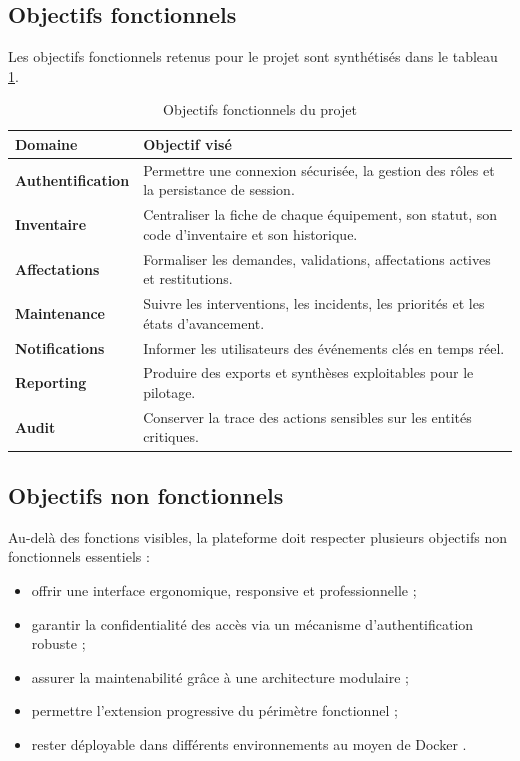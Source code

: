﻿\documentclass[12pt,a4paper,oneside]{report}
\begin{document}
\subsection{Objectifs fonctionnels}
Les objectifs fonctionnels retenus pour le projet sont synthétisés dans le tableau \ref{tab:objectifs-fonctionnels}.

\begin{table}[H]
\centering
\caption{Objectifs fonctionnels du projet}
\label{tab:objectifs-fonctionnels}
\begin{tabularx}{\textwidth}{>{\bfseries}p{3.4cm}X}
\toprule
Domaine & Objectif visé \\
\midrule
Authentification & Permettre une connexion sécurisée, la gestion des rôles et la persistance de session. \\
Inventaire & Centraliser la fiche de chaque équipement, son statut, son code d'inventaire et son historique. \\
Affectations & Formaliser les demandes, validations, affectations actives et restitutions. \\
Maintenance & Suivre les interventions, les incidents, les priorités et les états d'avancement. \\
Notifications & Informer les utilisateurs des événements clés en temps réel. \\
Reporting & Produire des exports et synthèses exploitables pour le pilotage. \\
Audit & Conserver la trace des actions sensibles sur les entités critiques. \\
\bottomrule
\end{tabularx}
\end{table}

\subsection{Objectifs non fonctionnels}
Au-delà des fonctions visibles, la plateforme doit respecter plusieurs objectifs non fonctionnels essentiels :
\begin{itemize}
  \item offrir une interface ergonomique, responsive et professionnelle ;
  \item garantir la confidentialité des accès via un mécanisme d'authentification robuste ;
  \item assurer la maintenabilité grâce à une architecture modulaire ;
  \item permettre l'extension progressive du périmètre fonctionnel ;
  \item rester déployable dans différents environnements au moyen de Docker \cite{merkel2014docker,dockerdocs}.
\end{itemize}
\end{document}
